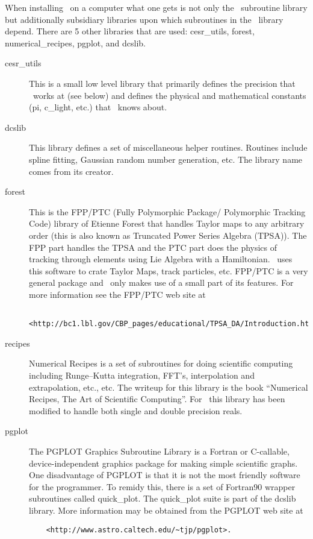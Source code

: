 \documentclass{book}
\begin{document}
When installing \bmad\ on a computer what one gets is not only the \bmad\
subroutine library but additionally subsidiary libraries upon which
subroutines in the \bmad\ library depend. There are 5 other libraries
that are used: cesr\_utils, forest, numerical\_recipes, pgplot, and dcslib.
\begin{description}
\item[cesr\_utils] This is a small low level library that primarily defines 
the precision that \bmad\ works at (see below) and defines the physical
and mathematical constants (pi, c\_light, etc.) that \bmad\ knows
about.
\item[dcslib] This library defines a set of miscellaneous helper routines. 
Routines include spline fitting, Gaussian random number generation,
etc. The library name comes from its creator.
\item[forest] This is the FPP/PTC 
(Fully Polymorphic Package/ Polymorphic Tracking Code) library of
Etienne Forest that handles Taylor maps to any arbitrary order (this
is also known as Truncated Power Series Algebra (TPSA)). The FPP part
handles the TPSA and the PTC part does the physics of tracking through
elements using Lie Algebra with a Hamiltonian.  \bmad\ uses this
software to crate Taylor Maps, track particles, etc.  FPP/PTC is a
very general package and \bmad\ only makes use of a small part of its
features. For more information see the FPP/PTC web site at
\begin{verbatim} 
    <http://bc1.lbl.gov/CBP_pages/educational/TPSA_DA/Introduction.html>
\end{verbatim}
\item[recipes] Numerical Recipes is a set of subroutines for doing 
scientific computing including Runge--Kutta integration, FFT's,
interpolation and extrapolation, etc., etc. The writeup for this
library is the book ``Numerical Recipes, The Art of Scientific
Computing''\cite{?}. For \bmad\ this library has been modified to handle
both single and double precision reals.
\item[pgplot] The PGPLOT Graphics Subroutine Library is a Fortran or 
C-callable, device-independent graphics package for making simple
scientific graphs.  One
disadvantage of PGPLOT is that it is not the most friendly software
for the programmer. To remidy this, there is a set of Fortran90
wrapper subroutines called quick\_plot. The quick\_plot suite is part
of the dcslib library. More information may be obtained from the PGPLOT
web site at 
\begin{verbatim}
    <http://www.astro.caltech.edu/~tjp/pgplot>.
\end{verbatim}

\end{description}
\end{document}
